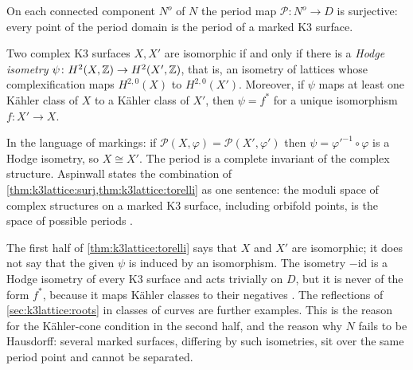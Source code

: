 \begin{theorem}\label{thm:k3lattice:surj}
On each connected component $N^o$ of $N$ the period map $\mathcal P\colon N^o\to D$ is
surjective: every point of the period domain is the period of a marked K3 surface. \TL{}
\end{theorem}

\begin{theorem}\label{thm:k3lattice:torelli}
Two complex K3 surfaces $X,X'$ are isomorphic if and only if there is a \emph{Hodge isometry}
$\psi\colon H^2(X,\mathbb{Z})\to H^2(X',\mathbb{Z})$, that is, an isometry of lattices whose complexification
maps $H^{2,0}(X)$ to $H^{2,0}(X')$. Moreover, if $\psi$ maps at least one Kähler class of $X$
to a Kähler class of $X'$, then $\psi=f^*$ for a unique isomorphism $f\colon X'\to X$. \TL{}
\end{theorem}
In the language of markings: if $\mathcal P(X,\varphi)=\mathcal P(X',\varphi')$ then
$\psi=\varphi'^{-1}\circ\varphi$ is a Hodge isometry, so $X\cong X'$. The period is a complete
invariant of the complex structure. Aspinwall states the combination of
\cref{thm:k3lattice:surj,thm:k3lattice:torelli} as one sentence: the moduli space of complex
structures on a marked K3 surface, including orbifold points, is the space of possible
periods .

\begin{pitfallbox}
The first half of \cref{thm:k3lattice:torelli} says that $X$ and $X'$ are isomorphic; it does
not say that the given $\psi$ is induced by an isomorphism. The isometry $-\mathrm{id}$ is a
Hodge isometry of every K3 surface and acts trivially on $D$, but it is never of the form
$f^*$, because it maps Kähler classes to their negatives
. The reflections of \cref{sec:k3lattice:roots} in
classes of curves are further examples. This is the reason for the Kähler-cone condition in
the second half, and the reason why $N$ fails to be Hausdorff: several marked surfaces,
differing by such isometries, sit over the same period point and cannot be separated.
\end{pitfallbox}

